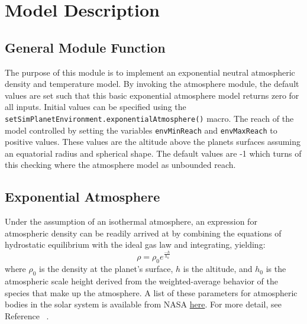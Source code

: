 
\section{Model Description}
\subsection{General Module Function}
The purpose of this module is to implement an exponential neutral atmospheric density and temperature model.
By invoking the atmosphere module, the default values are set such that this basic exponential atmosphere model returns zero for all inputs. Initial values can be specified using the {\tt setSimPlanetEnvironment.exponentialAtmosphere()} macro.
The reach of the model controlled by setting the variables {\tt envMinReach} and {\tt envMaxReach} to positive values.  These values are the altitude above the planets surfaces assuming an equatorial radius and spherical shape.  The default values are -1 which turns of this checking where the atmosphere model as unbounded reach.  

\subsection{Exponential Atmosphere}
Under the assumption of an isothermal atmosphere, an expression for atmospheric density can be readily arrived at by combining the equations of hydrostatic equilibrium with the ideal gas law and integrating, yielding:
\begin{equation}
\label{eq:expAtmo}
\rho = \rho_0 e^{\frac{-h}{h_0}}
\end{equation}
where $\rho_0$ is the density at the planet's surface, $h$ is the altitude, and $h_0$ is the atmospheric scale height derived from the weighted-average behavior of the species that make up the atmosphere. A list of these parameters
for atmospheric bodies in the solar system is available from NASA \href{https://nssdc.gsfc.nasa.gov/planetary/planetfact.html}{here}. For more detail, see Reference ~. 
